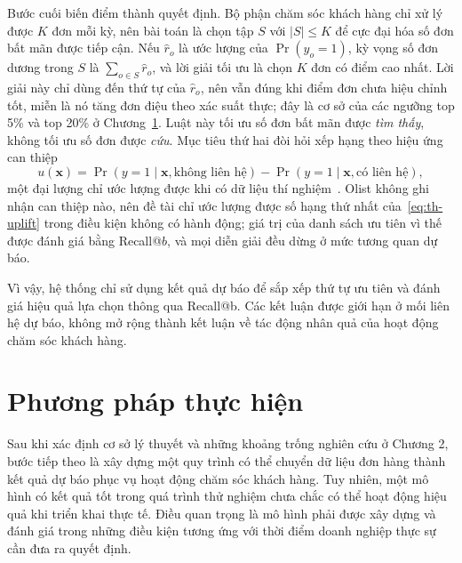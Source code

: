 \documentclass[12pt,a4paper]{report}
\begin{document}
Bước cuối biến điểm thành quyết định. Bộ phận chăm sóc khách hàng chỉ xử lý được $K$ đơn mỗi kỳ, nên bài toán là chọn tập $S$ với $|S| \le K$ để cực đại hóa số đơn bất mãn được tiếp cận. Nếu $\hat r_o$ là ước lượng của $\Pr(y_o = 1)$, kỳ vọng số đơn dương trong $S$ là $\sum_{o \in S} \hat r_o$, và lời giải tối ưu là chọn $K$ đơn có điểm cao nhất. Lời giải này chỉ dùng đến thứ tự của $\hat r_o$, nên vẫn đúng khi điểm đơn chưa hiệu chỉnh tốt, miễn là nó tăng đơn điệu theo xác suất thực; đây là cơ sở của các ngưỡng top 5\% và top 20\% ở Chương~\ref{ch:method}. Luật này tối ưu số đơn bất mãn được \emph{tìm thấy}, không tối ưu số đơn được \emph{cứu}. Mục tiêu thứ hai đòi hỏi xếp hạng theo hiệu ứng can thiệp
\begin{equation}\label{eq:th-uplift}
  u(\mathbf{x}) = \Pr\left( y = 1 \mid \mathbf{x}, \text{không liên hệ} \right) - \Pr\left( y = 1 \mid \mathbf{x}, \text{có liên hệ} \right),
\end{equation}
một đại lượng chỉ ước lượng được khi có dữ liệu thí nghiệm~\parencite{ascarza2018,devriendt2021}. Olist không ghi nhận can thiệp nào, nên đề tài chỉ ước lượng được số hạng thứ nhất của~\eqref{eq:th-uplift} trong điều kiện không có hành động; giá trị của danh sách ưu tiên vì thế được đánh giá bằng Recall@$b$, và mọi diễn giải đều dừng ở mức tương quan dự báo.

Vì vậy, hệ thống chỉ sử dụng kết quả dự báo để sắp xếp thứ tự ưu tiên và đánh giá hiệu quả lựa chọn thông qua Recall@b. Các kết luận được giới hạn ở mối liên hệ dự báo, không mở rộng thành kết luận về tác động nhân quả của hoạt động chăm sóc khách hàng.
 
\chapter{Phương pháp thực hiện}\label{ch:method}

Sau khi xác định cơ sở lý thuyết và những khoảng trống nghiên cứu ở Chương 2, bước tiếp theo là xây dựng một quy trình có thể chuyển dữ liệu đơn hàng thành kết quả dự báo phục vụ hoạt động chăm sóc khách hàng. Tuy nhiên, một mô hình có kết quả tốt trong quá trình thử nghiệm chưa chắc có thể hoạt động hiệu quả khi triển khai thực tế. Điều quan trọng là mô hình phải được xây dựng và đánh giá trong những điều kiện tương ứng với thời điểm doanh nghiệp thực sự cần đưa ra quyết định.
\end{document}

